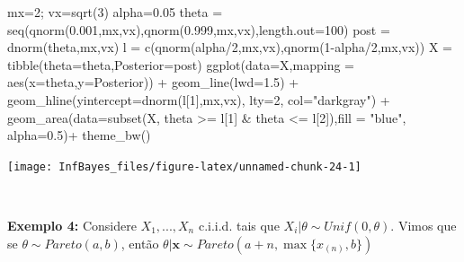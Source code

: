\documentclass[
]{book}
\newenvironment{Shaded}{\begin{snugshade}}{\end{snugshade}}
\newcommand{\AttributeTok}[1]{\textcolor[rgb]{0.77,0.63,0.00}{#1}}
\newcommand{\DecValTok}[1]{\textcolor[rgb]{0.00,0.00,0.81}{#1}}
\newcommand{\FloatTok}[1]{\textcolor[rgb]{0.00,0.00,0.81}{#1}}
\newcommand{\FunctionTok}[1]{\textcolor[rgb]{0.00,0.00,0.00}{#1}}
\newcommand{\NormalTok}[1]{#1}
\newcommand{\OtherTok}[1]{\textcolor[rgb]{0.56,0.35,0.01}{#1}}
\newcommand{\SpecialCharTok}[1]{\textcolor[rgb]{0.00,0.00,0.00}{#1}}
\newcommand{\StringTok}[1]{\textcolor[rgb]{0.31,0.60,0.02}{#1}}
\begin{document}
\begin{Shaded}
\begin{Highlighting}[]
\NormalTok{mx}\OtherTok{=}\DecValTok{2}\NormalTok{; vx}\OtherTok{=}\FunctionTok{sqrt}\NormalTok{(}\DecValTok{3}\NormalTok{)}
\NormalTok{alpha}\OtherTok{=}\FloatTok{0.05}
\NormalTok{theta }\OtherTok{=} \FunctionTok{seq}\NormalTok{(}\FunctionTok{qnorm}\NormalTok{(}\FloatTok{0.001}\NormalTok{,mx,vx),}\FunctionTok{qnorm}\NormalTok{(}\FloatTok{0.999}\NormalTok{,mx,vx),}\AttributeTok{length.out=}\DecValTok{100}\NormalTok{)}
\NormalTok{post }\OtherTok{=} \FunctionTok{dnorm}\NormalTok{(theta,mx,vx)}
\NormalTok{l }\OtherTok{=} \FunctionTok{c}\NormalTok{(}\FunctionTok{qnorm}\NormalTok{(alpha}\SpecialCharTok{/}\DecValTok{2}\NormalTok{,mx,vx),}\FunctionTok{qnorm}\NormalTok{(}\DecValTok{1}\SpecialCharTok{{-}}\NormalTok{alpha}\SpecialCharTok{/}\DecValTok{2}\NormalTok{,mx,vx))}
\NormalTok{X }\OtherTok{=} \FunctionTok{tibble}\NormalTok{(}\AttributeTok{theta=}\NormalTok{theta,}\AttributeTok{Posterior=}\NormalTok{post)}
\FunctionTok{ggplot}\NormalTok{(}\AttributeTok{data=}\NormalTok{X,}\AttributeTok{mapping =} \FunctionTok{aes}\NormalTok{(}\AttributeTok{x=}\NormalTok{theta,}\AttributeTok{y=}\NormalTok{Posterior)) }\SpecialCharTok{+}
  \FunctionTok{geom\_line}\NormalTok{(}\AttributeTok{lwd=}\FloatTok{1.5}\NormalTok{) }\SpecialCharTok{+}
  \FunctionTok{geom\_hline}\NormalTok{(}\AttributeTok{yintercept=}\FunctionTok{dnorm}\NormalTok{(l[}\DecValTok{1}\NormalTok{],mx,vx), }\AttributeTok{lty=}\DecValTok{2}\NormalTok{, }\AttributeTok{col=}\StringTok{"darkgray"}\NormalTok{) }\SpecialCharTok{+}
  \FunctionTok{geom\_area}\NormalTok{(}\AttributeTok{data=}\FunctionTok{subset}\NormalTok{(X, theta }\SpecialCharTok{\textgreater{}=}\NormalTok{ l[}\DecValTok{1}\NormalTok{] }\SpecialCharTok{\&}\NormalTok{ theta }\SpecialCharTok{\textless{}=}\NormalTok{ l[}\DecValTok{2}\NormalTok{]),}\AttributeTok{fill =} \StringTok{"blue"}\NormalTok{, }\AttributeTok{alpha=}\FloatTok{0.5}\NormalTok{)}\SpecialCharTok{+}
  \FunctionTok{theme\_bw}\NormalTok{()}
\end{Highlighting}
\end{Shaded}

\begin{center}\texttt{[image: InfBayes\_files/figure-latex/unnamed-chunk-24-1]} \end{center}

\(~\)

\textbf{Exemplo 4:} Considere \(X_1,...,X_n\) c.i.i.d. tais que \(X_i|\theta\sim Unif(0,\theta)\). Vimos que se \(\theta\sim Pareto(a,b)\), então \(\theta|\boldsymbol x\sim Pareto (a+n,\max\{x_{(n)},b\})\)
\end{document}
